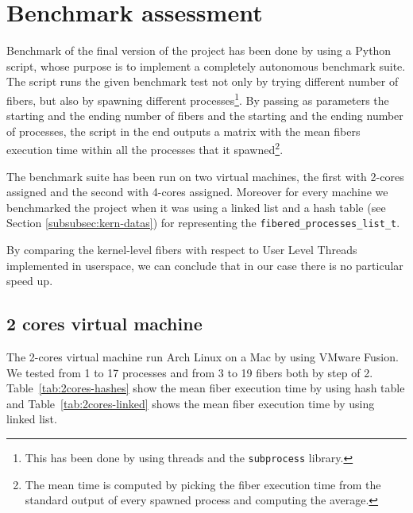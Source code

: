 \documentclass[a4paper,10pt]{article}
\begin{document}
\section{Benchmark assessment}
Benchmark of the final version of the project has been done by using a Python script, whose purpose is to implement a completely autonomous benchmark suite. The script runs the given benchmark test not only by trying different number of fibers, but also by spawning different processes\footnote{This has been done by using threads and the \lstinline{subprocess} library.}. By passing as parameters the starting and the ending number of fibers and the starting and the ending number of processes, the script in the end outputs a matrix with the mean fibers execution time within all the processes that it spawned\footnote{The mean time is computed by picking the fiber execution time from the standard output of every spawned process and computing the average.}.

The benchmark suite has been run on two virtual machines, the first with 2-cores assigned and the second with 4-cores assigned. Moreover for every machine we benchmarked the project when it was using a linked list and a hash table (see Section \ref{subsubsec:kern-datas}) for representing the \lstinline{fibered_processes_list_t}.

By comparing the kernel-level fibers with respect to User Level Threads implemented in userspace, we can conclude that in our case there is no particular speed up.
\subsection{2 cores virtual machine}
The 2-cores virtual machine run Arch Linux on a Mac by using VMware Fusion. We tested from 1 to 17 processes and from 3 to 19 fibers both by step of 2. Table~\ref{tab:2cores-hashes} show the mean fiber execution time by using hash table and Table~\ref{tab:2cores-linked} shows the mean fiber execution time by using linked list.
\end{document}
